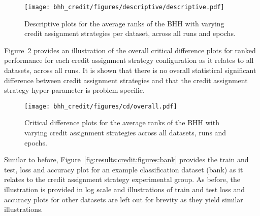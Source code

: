 \begin{figure}[H]
	\centering
	\texttt{[image: bhh\_credit/figures/descriptive/descriptive.pdf]}
	\caption{Descriptive plots for the average ranks of the \acs{BHH} with varying credit assignment strategies per dataset, across all runs and epochs.}
	\label{fig:results:credit:descriptive:descriptive}
\end{figure}

Figure~\ref{fig:results:credit:descriptive:cd} provides an illustration of the overall critical difference plots for ranked performance for each credit assignment strategy configuration as it relates to all datasets, across all runs. It is shown that there is no overall statistical significant difference between credit assignment strategies and that the credit assignment strategy hyper-parameter is problem specific.

\begin{figure}[H]
	\centering
	\texttt{[image: bhh\_credit/figures/cd/overall.pdf]}
	\caption{Critical difference plots for the average ranks of the \acs{BHH} with varying credit assignment strategies across all datasets, runs and epochs.}
	\label{fig:results:credit:descriptive:cd}
\end{figure}

Similar to before, Figure~\ref{fig:results:credit:figures:bank} provides the train and test, loss and accuracy plot for an example classification dataset (bank) as it relates to the credit assignment strategy experimental group. As before, the illustration is provided in log scale and illustrations of train and test loss and accuracy plots for other datasets are left out for brevity as they yield similar illustrations.

